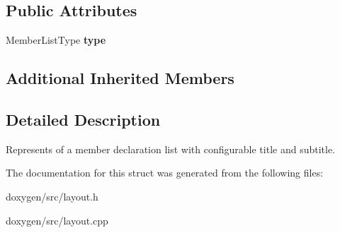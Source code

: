 \subsection*{Public Attributes}
\begin{DoxyCompactItemize}
\item 
\mbox{\label{struct_layout_doc_entry_member_decl_a9a03c58c4e1d6e007eabd27834106db4}} 
Member\+List\+Type {\bfseries type}
\end{DoxyCompactItemize}
\subsection*{Additional Inherited Members}


\subsection{Detailed Description}
Represents of a member declaration list with configurable title and subtitle. 

The documentation for this struct was generated from the following files\+:\begin{DoxyCompactItemize}
\item 
doxygen/src/layout.\+h\item 
doxygen/src/layout.\+cpp\end{DoxyCompactItemize}
